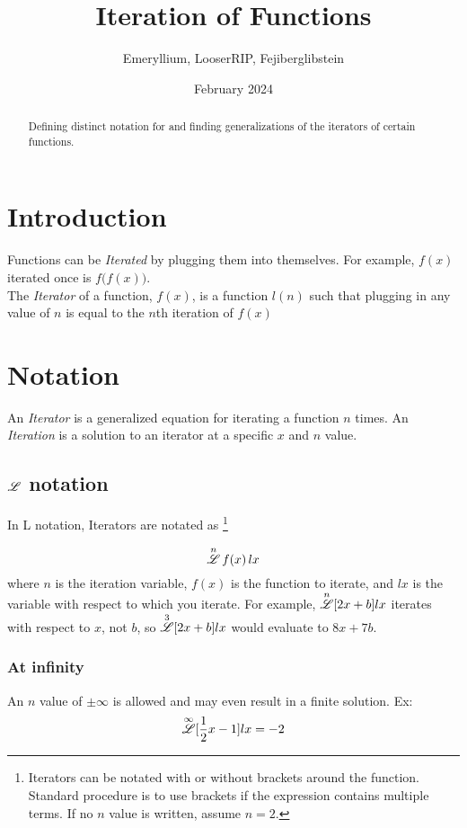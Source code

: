 \documentclass[12pt, letterpaper]{article}
\title{Iteration of Functions}
\author{Emeryllium, LooserRIP, Fejiberglibstein}
\date{February 2024}
\begin{document}
\maketitle

\begin{abstract}
    Defining distinct notation for and finding generalizations of the iterators of certain functions.
\end{abstract}

\tableofcontents
\newpage

\section{Introduction}
Functions can be \textit{Iterated} by plugging them into themselves. For example, $f(x)$ iterated once is $f\big(f(x)\big)$. 
\\
The \textit{Iterator} of a function, $f(x)$, is a function $l(n)$ such that plugging in any value of $n$ is equal to the $n$th iteration of $f(x)$


\section{Notation}

An \textit{Iterator} is a generalized equation for iterating a function $n$ times.
An \textit{Iteration} is a solution to an iterator at a specific $x$ and $n$ value.

\subsection{$\overset{}{\mathscr{L}}$ notation}
In L notation, Iterators are notated as
    \footnote{Iterators can be notated with or without brackets around the function. Standard procedure is to use brackets if the expression contains multiple terms. If no $n$ value is written, assume $n=2$.}

$$ \overset{n}{\mathscr{L}} \, f(x) \, lx$$
where $n$ is the iteration variable, $f(x)$ is the function to iterate, and $lx$ is the variable with respect to which you iterate. For example, $\overset{n}{\mathscr{L}} [2x+b] lx$
iterates with respect to $x$, not $b$, so $\overset{3}{\mathscr{L}} [2x+b] lx$ would evaluate to $8x+7b$.

\subsubsection{At infinity}
An $n$ value of $\pm\infty$ is allowed and may even result in a finite solution. Ex:
$$\overset{\infty}{\mathscr{L}} [\frac{1}{2}x - 1] lx = -2$$
\end{document}
